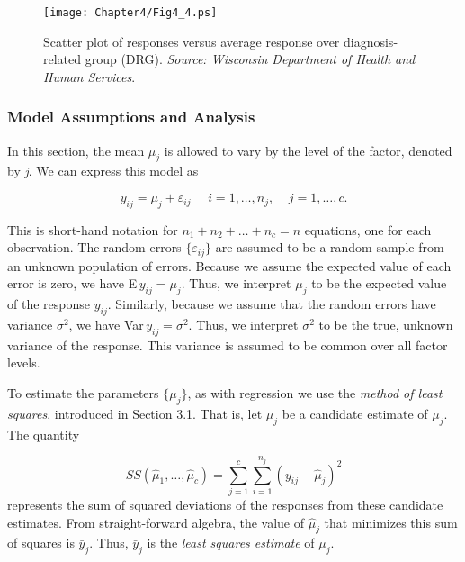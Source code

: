 \linejed

\begin{figure}[htp]
  \begin{center}
    \texttt{[image: Chapter4/Fig4\_4.ps]}
    \caption{\label{F4:DRGObsFits} \small  Scatter plot of responses versus average response over diagnosis-related
group (DRG). \textit{Source: Wisconsin Department of Health and
Human Services}.}
  \end{center}
\end{figure}



\subsubsection*{Model Assumptions and Analysis}

In this section, the mean $\mu_j$ is allowed to vary by the level of
the factor, denoted by \textit{j}. We can express this model as

\begin{equation*}
y_{ij}=\mu_{j}+ \varepsilon_{ij}\ \ \ \ \ \ i=1,\ldots ,n_{j},\ \ \
\ \ j=1,\ldots ,c.
\end{equation*}

This is short-hand notation for $n_1+n_2+\ldots +n_{c}=n$ equations,
one for each observation. The random errors $\{ \varepsilon_{ij} \}$
are assumed to be a random sample from an unknown population of
errors. Because we assume the expected value of each error is zero,
we have E$\,y_{ij}=\mu_{j}$. Thus, we interpret $\mu_{j}$ to be the
expected value of the response $y_{ij}$. Similarly, because we
assume that the random errors have variance $\sigma ^{2}$, we have
Var$\,y_{ij}=\sigma ^{2}$. Thus, we interpret $\sigma ^{2}$ to be
the true, unknown variance of the response. This variance is assumed
to be common over all factor levels.

To estimate the parameters $\{\mu_{j}\}$, as with regression we use
the \textit{method of least squares}, introduced in Section 3.1.
That is, let $\hat{\mu}_j$ be a candidate estimate of $\mu_{j}$. The
quantity

\begin{equation*}
SS(\hat{\mu}_1,\ldots
,\hat{\mu}_{c})=\sum_{j=1}^{c}\sum_{i=1}^{n_{j}}(y_{ij}-\hat{\mu}_{j})^{2}
\end{equation*}%
represents the sum of squared deviations of the responses from these
candidate estimates. From straight-forward algebra, the value of
$\hat{\mu}_j$ that minimizes this sum of squares is $\bar{y}_{j}$.
Thus, $\bar{y}_{j}$ is the \textit{least squares estimate }of $\mu
_{j}$.

